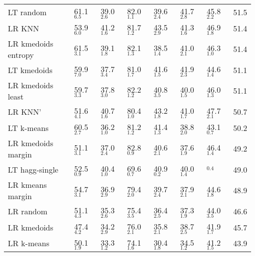 \begin{tabular}{llllllll}
          LT random &        61.1$_{6.5}$ &        39.0$_{2.6}$ &        82.0$_{1.1}$ &        39.6$_{2.4}$ &        41.7$_{2.8}$ &        45.8$_{2.2}$ &        51.5 \\
             LR KNN &        53.9$_{6.0}$ &        41.2$_{1.6}$ &        81.7$_{1.2}$ &        43.5$_{2.9}$ &        41.3$_{1.6}$ &        46.9$_{1.8}$ &        51.4 \\
LR kmedoids entropy &        61.5$_{3.1}$ &        39.1$_{1.8}$ &        82.1$_{1.3}$ &        38.5$_{1.4}$ &        41.0$_{2.1}$ &        46.3$_{1.0}$ &        51.4 \\
        LT kmedoids &        59.9$_{7.0}$ &        37.7$_{3.4}$ &        81.0$_{1.7}$ &        41.6$_{1.5}$ &        41.9$_{2.3}$ &        44.6$_{1.4}$ &        51.1 \\
  LR kmedoids least &        59.7$_{3.3}$ &        37.8$_{3.0}$ &        82.2$_{1.2}$ &        40.8$_{3.5}$ &        40.0$_{1.5}$ &        46.0$_{1.3}$ &        51.1 \\
            LR KNN' &        51.6$_{4.1}$ &        40.7$_{1.6}$ &        80.4$_{1.0}$ &        43.2$_{1.8}$ &        41.0$_{1.7}$ &        47.7$_{2.1}$ &        50.7 \\
         LT k-means &        60.5$_{2.7}$ &        36.2$_{1.0}$ &        81.2$_{1.2}$ &        41.4$_{1.3}$ &        38.8$_{2.0}$ &        43.1$_{0.7}$ &        50.2 \\
 LR kmedoids margin &        51.1$_{3.1}$ &        37.0$_{2.4}$ &        82.8$_{0.9}$ &        40.6$_{2.1}$ &        37.6$_{1.9}$ &        46.4$_{1.4}$ &        49.2 \\
     LT hagg-single &        52.5$_{0.9}$ &        40.4$_{1.0}$ &        69.6$_{0.7}$ &        40.9$_{0.2}$ &        40.0$_{1.4}$ & \bftab 50.6$_{0.4}$ &        49.0 \\
   LR kmeans margin &        54.7$_{3.1}$ &        36.9$_{2.9}$ &        79.4$_{2.0}$ &        39.7$_{2.4}$ &        37.9$_{2.1}$ &        44.6$_{1.8}$ &        48.9 \\
          LR random &        51.1$_{4.3}$ &        35.3$_{2.6}$ &        75.4$_{3.5}$ &        36.4$_{2.5}$ &        37.3$_{1.9}$ &        44.0$_{3.5}$ &        46.6 \\
        LR kmedoids &        47.4$_{4.2}$ &        34.2$_{2.9}$ &        76.0$_{2.1}$ &        35.8$_{2.1}$ &        38.7$_{2.5}$ &        41.9$_{1.7}$ &        45.7 \\
         LR k-means &        50.1$_{1.9}$ &        33.3$_{1.2}$ &        74.1$_{1.6}$ &        30.4$_{1.8}$ &        34.5$_{1.2}$ &        41.2$_{1.5}$ &        43.9 \\
\bottomrule
\end{tabular}
